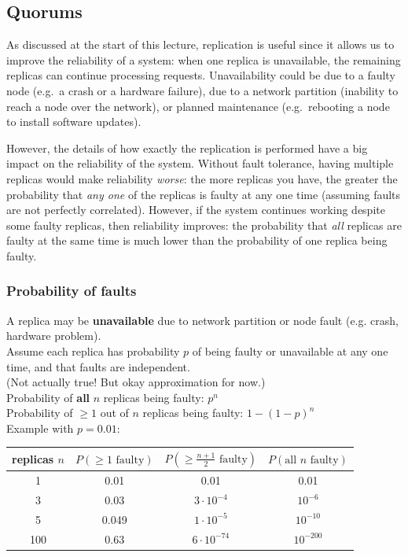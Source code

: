 \subsection{Quorums}\label{sec:quorums}

As discussed at the start of this lecture, replication is useful since it allows us to improve the reliability of a system: when one replica is unavailable, the remaining replicas can continue processing requests.
Unavailability could be due to a faulty node (e.g.\ a crash or a hardware failure), due to a network partition (inability to reach a node over the network), or planned maintenance (e.g.\ rebooting a node to install software updates).

However, the details of how exactly the replication is performed have a big impact on the reliability of the system.
Without fault tolerance, having multiple replicas would make reliability \emph{worse}: the more replicas you have, the greater the probability that \emph{any one} of the replicas is faulty at any one time (assuming faults are not perfectly correlated).
However, if the system continues working despite some faulty replicas, then reliability improves: the probability that \emph{all} replicas are faulty at the same time is much lower than the probability of one replica being faulty.


\begin{frame}
    \label{s:fault-probability}
    \frametitle{Probability of faults}
    A replica may be \textbf{unavailable} due to network partition or node fault (e.g. crash, hardware problem).\\[1em]\pause
    Assume each replica has probability $p$ of being faulty or unavailable at any one time, and that faults are independent.\\
    {\footnotesize (Not actually true! But okay approximation for now.)}\\[1em]\pause
    Probability of \textbf{all} $n$ replicas being faulty: $p^n$\\
    Probability of $\ge 1$ out of $n$ replicas being faulty: $1-(1-p)^n$\\[1em]\pause
    Example with $p=0.01$:\\[0.5em]
    \begin{tabular}{c|c|c|c}
        \hline
        replicas $n$ & $P(\ge 1 \text{ faulty})$ & $P(\ge \frac{n+1}{2}\text{ faulty})$ & $P(\text{all } n \text{ faulty})$ \\\hline
        1 & 0.01 & 0.01 & 0.01 \\
        3 & 0.03 & $3 \cdot 10^{-4}$ & $10^{-6}$ \\
        5 & 0.049 & $1 \cdot 10^{-5}$ & $10^{-10}$ \\
        100 & 0.63 & $6 \cdot 10^{-74}$ & $10^{-200}$ \\\hline
    \end{tabular}
\end{frame}
\label{l:fault-probability}

